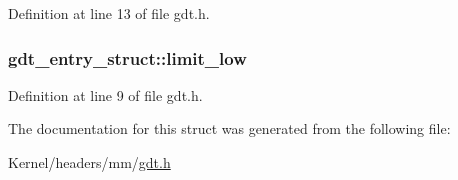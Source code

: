 Definition at line 13 of file gdt.h.

\hypertarget{structgdt__entry__struct_a2d72f76609ed1e4900101767967ac195}{
\subsubsection[{limit\_\-low}]{ {\bf gdt\_\-entry\_\-struct::limit\_\-low}}}
\label{structgdt__entry__struct_a2d72f76609ed1e4900101767967ac195}


Definition at line 9 of file gdt.h.



The documentation for this struct was generated from the following file:\begin{DoxyCompactItemize}
\item 
Kernel/headers/mm/\hyperlink{gdt_8h}{gdt.h}\end{DoxyCompactItemize}
